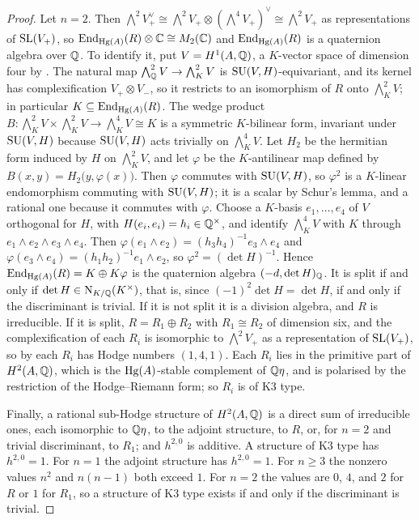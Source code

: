 \begin{proof}
Let $n=2$. Then $\bigwedge^{2}V_{+}^{\vee}\cong\bigwedge^{2}V_{+}\otimes
(\bigwedge^{4}V_{+})^{\vee}\cong\bigwedge^{2}V_{+}$ as representations of
$\operatorname{SL}(V_{+})$, so $\operatorname{End}_{\operatorname{Hg}(A)}(R)\otimes\mathbb{C}\cong M_{2}(\mathbb{C})$ and
$\operatorname{End}_{\operatorname{Hg}(A)}(R)$ is a quaternion algebra over $\mathbb{Q}$. To identify it, put
$V=H^{1}(A,\mathbb{Q})$, a $K$-vector space of dimension four by .
The natural map $\bigwedge^{2}_{\mathbb{Q}}V\to\bigwedge^{2}_{K}V$ is
$\operatorname{SU}(V,H)$-equivariant, and its kernel has complexification
$V_{+}\otimes V_{-}$, so it restricts to an isomorphism of $R$ onto
$\bigwedge^{2}_{K}V$; in particular $K\subseteq\operatorname{End}_{\operatorname{Hg}(A)}(R)$. The wedge
product $B\colon\bigwedge^{2}_{K}V\times\bigwedge^{2}_{K}V\to
\bigwedge^{4}_{K}V\cong K$ is a symmetric $K$-bilinear form, invariant under
$\operatorname{SU}(V,H)$ because $\operatorname{SU}(V,H)$ acts trivially on $\bigwedge^{4}_{K}V$. Let
$H_{2}$ be the hermitian form induced by $H$ on $\bigwedge^{2}_{K}V$, and let
$\varphi$ be the $K$-antilinear map defined by
$B(x,y)=H_{2}\bigl(y,\varphi(x)\bigr)$. Then $\varphi$ commutes with
$\operatorname{SU}(V,H)$, so $\varphi^{2}$ is a $K$-linear endomorphism commuting with
$\operatorname{SU}(V,H)$; it is a scalar by Schur's lemma, and a rational one because it
commutes with $\varphi$. Choose a $K$-basis $e_{1},\dots,e_{4}$ of $V$
orthogonal for $H$, with $H(e_{i},e_{i})=h_{i}\in\mathbb{Q}^{\times}$, and identify
$\bigwedge^{4}_{K}V$ with $K$ through $e_{1}\wedge e_{2}\wedge e_{3}\wedge
e_{4}$. Then $\varphi(e_{1}\wedge e_{2})=(h_{3}h_{4})^{-1}e_{3}\wedge e_{4}$
and $\varphi(e_{3}\wedge e_{4})=(h_{1}h_{2})^{-1}e_{1}\wedge e_{2}$, so
$\varphi^{2}=(\det H)^{-1}$. Hence $\operatorname{End}_{\operatorname{Hg}(A)}(R)=K\oplus K\varphi$ is the
quaternion algebra $(-d,\det H)_{\mathbb{Q}}$. It is split if and only if
$\det H\in\mathrm{N}_{K/\mathbb{Q}}(K^{\times})$, that is, since $(-1)^{2}\det H=\det H$, if and
only if the discriminant is trivial. If it is not split it is a division
algebra, and $R$ is irreducible. If it is split, $R=R_{1}\oplus R_{2}$ with
$R_{1}\cong R_{2}$ of dimension six, and the complexification of each $R_{i}$
is isomorphic to $\bigwedge^{2}V_{+}$ as a representation of $\operatorname{SL}(V_{+})$, so
by  each $R_{i}$ has Hodge numbers $(1,4,1)$. Each $R_{i}$
lies in the primitive part of $H^{2}(A,\mathbb{Q})$, which is the $\operatorname{Hg}(A)$-stable
complement of $\mathbb{Q}\eta$, and is polarised by the restriction of the
Hodge--Riemann form; so $R_{i}$ is of K3 type.

Finally, a rational sub-Hodge structure of $H^{2}(A,\mathbb{Q})$ is a direct sum of
irreducible ones, each isomorphic to $\mathbb{Q}\eta$, to the adjoint structure, to
$R$, or, for $n=2$ and trivial discriminant, to $R_{1}$; and $h^{2,0}$ is
additive. A structure of K3 type has $h^{2,0}=1$. For $n=1$ the adjoint
structure has $h^{2,0}=1$. For $n\ge3$ the nonzero values $n^{2}$ and
$n(n-1)$ both exceed $1$. For $n=2$ the values are $0$, $4$, and $2$ for $R$
or $1$ for $R_{1}$, so a structure of K3 type exists if and only if the
discriminant is trivial.
\end{proof}

